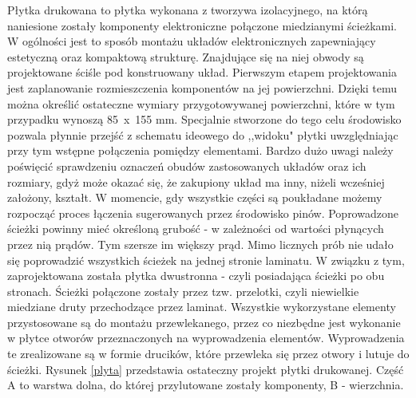 Płytka drukowana to płytka wykonana z tworzywa izolacyjnego, na którą naniesione zostały komponenty elektroniczne połączone miedzianymi ścieżkami. W ogólności jest to sposób montażu układów elektronicznych zapewniający estetyczną oraz kompaktową strukturę. Znajdujące się na niej obwody są projektowane ściśle pod konstruowany układ.
Pierwszym etapem projektowania jest zaplanowanie rozmieszczenia komponentów na jej powierzchni. Dzięki temu można określić ostateczne wymiary przygotowywanej powierzchni, które w tym przypadku wynoszą 85~x~155 mm. Specjalnie stworzone do tego celu środowisko pozwala płynnie przejść z schematu ideowego do ,,widoku" płytki uwzględniając przy tym wstępne połączenia pomiędzy elementami. Bardzo dużo uwagi należy poświęcić sprawdzeniu oznaczeń obudów zastosowanych układów oraz ich rozmiary, gdyż może okazać się, że zakupiony układ ma inny, niżeli wcześniej założony, kształt. W momencie, gdy wszystkie części są poukładane możemy rozpocząć proces łączenia sugerowanych przez środowisko pinów. Poprowadzone ścieżki powinny mieć określoną grubość - w zależności od wartości płynących przez nią prądów. Tym szersze im większy prąd. Mimo licznych prób nie udało się poprowadzić wszystkich ścieżek na jednej stronie laminatu. W związku z tym, zaprojektowana została płytka dwustronna - czyli posiadająca ścieżki po obu stronach. Ścieżki połączone zostały przez tzw. przelotki, czyli niewielkie miedziane druty przechodzące przez laminat. Wszystkie wykorzystane elementy przystosowane są do montażu przewlekanego, przez co niezbędne jest wykonanie w płytce otworów przeznaczonych na wyprowadzenia elementów. Wyprowadzenia te zrealizowane są w formie drucików, które przewleka się przez otwory i lutuje do ścieżki. Rysunek \ref{plyta} przedstawia ostateczny projekt płytki drukowanej. Część A to warstwa dolna, do której przylutowane zostały komponenty, B - wierzchnia.
\newpage
